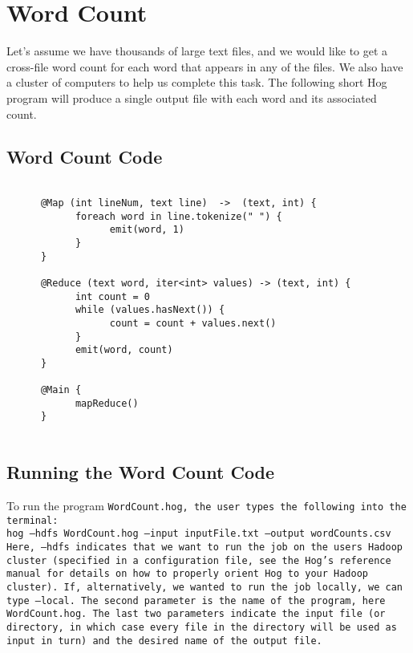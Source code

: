 \documentclass{article} \usepackage{fancyhdr, multicol}
\begin{document}
\section*{Word Count} 
\label{word_count} 

Let's assume we have thousands of large text files, and we would like to get a
cross-file word count for each word that appears in any of the files. We also have
a cluster of computers to help us complete this task. The following short Hog
program will produce a single output file with each word and its associated count.

\subsection*{Word Count Code}
\begin{verbatim}
      
      @Map (int lineNum, text line)  ->  (text, int) {
            foreach word in line.tokenize(" ") {
                  emit(word, 1)
            }
      }
      
      @Reduce (text word, iter<int> values) -> (text, int) {
            int count = 0
            while (values.hasNext()) {
                  count = count + values.next()
            }
            emit(word, count)
      }
      
      @Main {
            mapReduce()
      }
      
\end{verbatim}

\subsection{Running the Word Count Code} %
\label{sub:running_the_word_count_code}

To run the program \tt WordCount.hog\rm, the user types the following into the
terminal: \\

\noindent \tt hog --hdfs WordCount.hog --input inputFile.txt
--output wordCounts.csv \rm \\

Here, \tt --hdfs \rm indicates that we want to run the job on the users Hadoop
cluster (specified in a configuration file, see the Hog's reference manual for
details on how to properly orient Hog to your Hadoop cluster). If, alternatively,
we wanted to run the job locally, we can type \tt --local\rm. The second parameter
is the name of the program, here \tt WordCount.hog\rm. The last two parameters
indicate the input file (or directory, in which case every file in the directory
will be used as input in turn) and the desired name of the output file.
\end{document}
